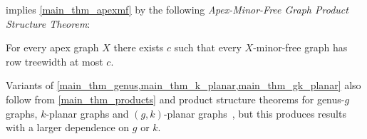 \documentclass{patmorin}
\newcommand{\david}[1]{{\color{orange} David: #1}}
\newcommand{\pat}[1]{\textcolor{Blue}{Pat: #1}}
\newcommand{\defin}[1]{\emph{\textcolor{brightmaroon}{#1}}}
\begin{document}
 implies \cref{main_thm_apexmf} by the following \defin{Apex-Minor-Free Graph Product Structure Theorem}:

\begin{thm}\label{apexmf_product_structure}
  For every apex graph $X$ there exists $c$ such that every $X$-minor-free graph has row treewidth at most $c$.
\end{thm}

Variants of \cref{main_thm_genus,main_thm_k_planar,main_thm_gk_planar} also follow from \cref{main_thm_products} and product structure theorems for genus-$g$ graphs, $k$-planar graphs and $(g,k)$-planar graphs~\cite{dujmovic.joret.ea:planar,distel.hickingbotham.ea:improved,dujmovic.morin.ea:graph,distel.hickingbotham.ea:powers}, but this produces results with a larger dependence on $g$ or $k$.


%
%
%
\end{document}
